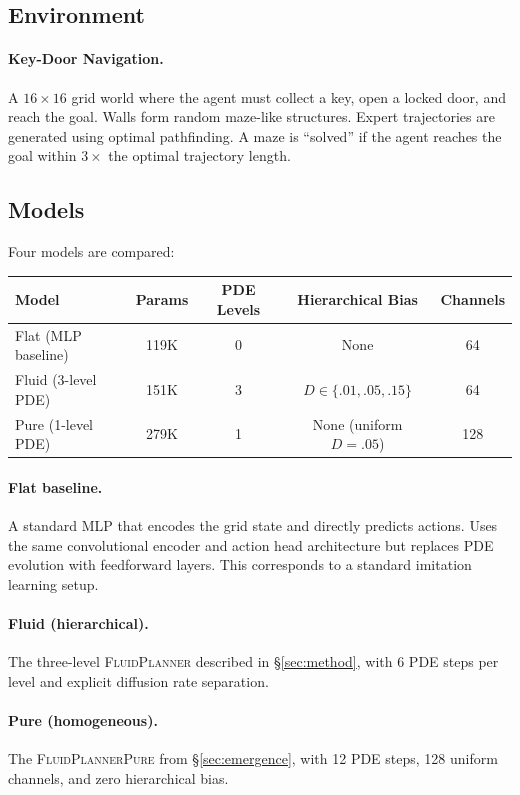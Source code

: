\documentclass{article}
\newcommand{\fluidplanner}{\textsc{FluidPlanner}}
\begin{document}
\subsection{Environment}

\paragraph{Key-Door Navigation.} A $16 \times 16$ grid world where the agent must collect a key, open a locked door, and reach the goal. Walls form random maze-like structures. Expert trajectories are generated using optimal pathfinding. A maze is ``solved'' if the agent reaches the goal within $3\times$ the optimal trajectory length.

\subsection{Models}

Four models are compared:

\begin{center}
\begin{tabular}{lcccc}
\toprule
Model & Params & PDE Levels & Hierarchical Bias & Channels \\
\midrule
Flat (MLP baseline) & 119K & 0 & None & 64 \\
Fluid (3-level PDE) & 151K & 3 & $D \in \{.01, .05, .15\}$ & 64 \\
Pure (1-level PDE) & 279K & 1 & None (uniform $D = .05$) & 128 \\
\bottomrule
\end{tabular}
\end{center}

\paragraph{Flat baseline.} A standard MLP that encodes the grid state and directly predicts actions. Uses the same convolutional encoder and action head architecture but replaces PDE evolution with feedforward layers. This corresponds to a standard imitation learning setup.

\paragraph{Fluid (hierarchical).} The three-level \fluidplanner{} described in \S\ref{sec:method}, with 6 PDE steps per level and explicit diffusion rate separation.

\paragraph{Pure (homogeneous).} The \textsc{FluidPlannerPure} from \S\ref{sec:emergence}, with 12 PDE steps, 128 uniform channels, and zero hierarchical bias.
\end{document}
